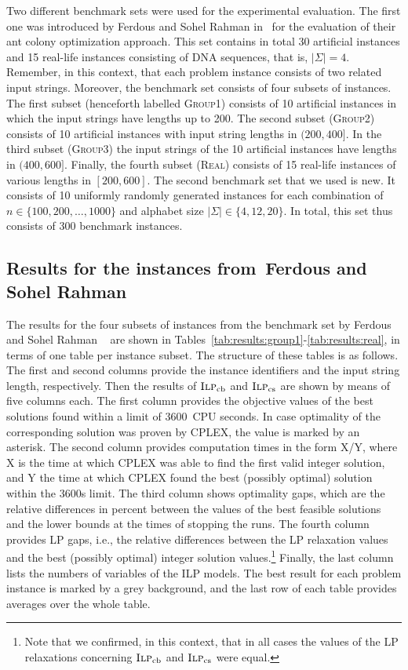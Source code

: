 \documentclass[11pt,a4paper]{article}
\newcommand{\MIPorig}{\textsc{Ilp}_{\mathrm{cb}}}
\newcommand{\MIPalt}{\textsc{Ilp}_{\mathrm{cs}}}
\begin{document}
Two different benchmark sets were used for the experimental evaluation.
The first one was introduced by Ferdous and Sohel Rahman
in~\cite{Ferdous2013} for the evaluation of their ant
colony optimization approach. This set contains in total 30 artificial
instances and 15 real-life instances consisting of DNA sequences, that is, $|\Sigma|=4$.
Remember, in this context, that each problem instance consists of two
related input strings. Moreover, the benchmark set consists of four
subsets of instances. The first subset (henceforth labelled
\textsc{Group1}) consists of 10 artificial instances in which the input
strings have lengths up to 200. The second subset (\textsc{Group2})
consists of 10 artificial instances with input string lengths in
$(200,400]$. In the third subset (\textsc{Group3}) the input strings of
the 10 artificial instances have lengths in $(400,600]$. Finally,
the fourth subset (\textsc{Real}) consists of 15 real-life instances of
various lengths in $[200,600]$. The second benchmark set that we used
is new. It consists of 10 uniformly randomly generated instances for each
combination of $n \in \{100, 200, \ldots, 1000\}$ and alphabet size $|\Sigma| \in \{4,
12, 20\}$. In total, this set thus consists of 300 benchmark instances.

\subsection{Results for the instances from~Ferdous and Sohel Rahman}

The results for the four subsets of instances from the benchmark set by
Ferdous and Sohel Rahman ~\cite{Ferdous2013} are shown in
Tables~\ref{tab:results:group1}-\ref{tab:results:real}, in terms of one
table per instance subset. The structure of these tables is as follows.
The first and second columns provide the instance identifiers and the input string length, respectively. Then the results of
$\MIPorig$ and $\MIPalt$ are shown by means of five columns each.
The first column provides the objective values of the best solutions
found within a limit of 3600~CPU seconds. In case optimality of the
corresponding solution was proven by CPLEX, the value is marked by an
asterisk. The second column provides computation times in the form X/Y, 
where X is the time at which CPLEX was able to find the first valid integer
solution, and Y the time at which CPLEX found the best
(possibly optimal) solution within the 3600s limit. The third 
column shows optimality gaps, which are the relative differences in
percent between the values of the best feasible solutions and the lower
bounds at the times of stopping the runs. The fourth column provides LP
gaps, i.e.,
the relative differences between the LP relaxation values and the
best (possibly optimal) integer solution values.\footnote{Note that we
confirmed, in this context, that in all cases the values of the LP
relaxations concerning $\MIPorig$ and $\MIPalt$ were equal.} Finally,
the last column lists the numbers of variables of the ILP models.
The best result for each problem instance
is marked by a grey background, and the last row of each table provides
averages over the whole table.
\end{document}
